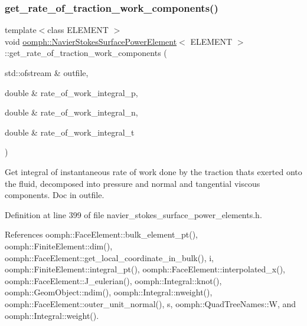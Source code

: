 \subsubsection{\texorpdfstring{get\+\_\+rate\+\_\+of\+\_\+traction\+\_\+work\+\_\+components()}{get\_rate\_of\_traction\_work\_components()}\hspace{0.1cm}{\footnotesize\ttfamily [2/2]}}
{\footnotesize\ttfamily template$<$class E\+L\+E\+M\+E\+NT $>$ \\
void \hyperlink{classoomph_1_1NavierStokesSurfacePowerElement}{oomph\+::\+Navier\+Stokes\+Surface\+Power\+Element}$<$ E\+L\+E\+M\+E\+NT $>$\+::get\+\_\+rate\+\_\+of\+\_\+traction\+\_\+work\+\_\+components (\begin{DoxyParamCaption}\item[{std\+::ofstream \&}]{outfile,  }\item[{double \&}]{rate\+\_\+of\+\_\+work\+\_\+integral\+\_\+p,  }\item[{double \&}]{rate\+\_\+of\+\_\+work\+\_\+integral\+\_\+n,  }\item[{double \&}]{rate\+\_\+of\+\_\+work\+\_\+integral\+\_\+t }\end{DoxyParamCaption})\hspace{0.3cm}{\ttfamily [inline]}}



Get integral of instantaneous rate of work done by the traction that\textquotesingle{}s exerted onto the fluid, decomposed into pressure and normal and tangential viscous components. Doc in outfile. 



Definition at line 399 of file navier\+\_\+stokes\+\_\+surface\+\_\+power\+\_\+elements.\+h.



References oomph\+::\+Face\+Element\+::bulk\+\_\+element\+\_\+pt(), oomph\+::\+Finite\+Element\+::dim(), oomph\+::\+Face\+Element\+::get\+\_\+local\+\_\+coordinate\+\_\+in\+\_\+bulk(), i, oomph\+::\+Finite\+Element\+::integral\+\_\+pt(), oomph\+::\+Face\+Element\+::interpolated\+\_\+x(), oomph\+::\+Face\+Element\+::\+J\+\_\+eulerian(), oomph\+::\+Integral\+::knot(), oomph\+::\+Geom\+Object\+::ndim(), oomph\+::\+Integral\+::nweight(), oomph\+::\+Face\+Element\+::outer\+\_\+unit\+\_\+normal(), s, oomph\+::\+Quad\+Tree\+Names\+::W, and oomph\+::\+Integral\+::weight().

\mbox{\label{classoomph_1_1NavierStokesSurfacePowerElement_ad30a10d36ecfaebe0add91c0750e52f7}} 

